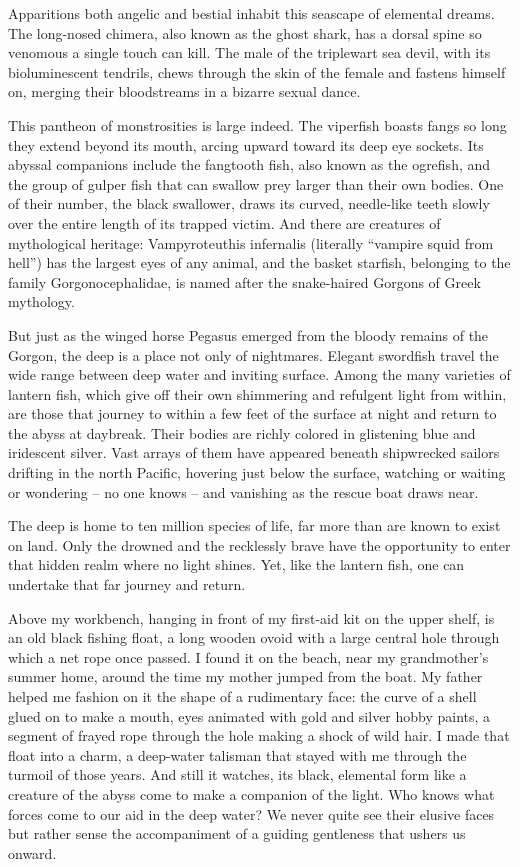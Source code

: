 \documentclass[letterpaper,10pt,headsepline]{scrreprt}
\begin{document}
Apparitions both angelic and bestial inhabit this seascape of elemental dreams. The long-­nosed chimera, also known as the ghost shark, has a dorsal spine so venomous a single touch can kill. The male of the triplewart sea devil, with its bioluminescent tendrils, chews through the skin of the female and fastens himself on, merging their bloodstreams in a bizarre sexual dance.

This pantheon of monstrosities is large indeed. The viperfish boasts fangs so long they extend beyond its mouth, arcing upward toward its deep eye sockets. Its abyssal companions include the fangtooth fish, also known as the ogrefish, and the group of gulper fish that can swallow prey larger than their own bodies. One of their number, the black swallower, draws its curved, needle-­like teeth slowly over the entire length of its trapped victim. And there are creatures of mythological heritage: Vampyroteuthis infernalis (literally “vampire squid from hell”) has the largest eyes of any animal, and the basket starfish, belonging to the family Gorgonocephalidae, is named after the snake-­haired Gorgons of Greek mythology.

But just as the winged horse Pegasus emerged from the bloody remains of the Gorgon, the deep is a place not only of nightmares. Elegant swordfish travel the wide range between deep water and inviting surface. Among the many varieties of lantern fish, which give off their own shimmering and refulgent light from within, are those that journey to within a few feet of the surface at night and return to the abyss at daybreak. Their bodies are richly colored in glistening blue and iridescent silver. Vast arrays of them have appeared beneath shipwrecked sailors drifting in the north Pacific, hovering just below the surface, watching or waiting or wondering – no one knows – and vanishing as the rescue boat draws near.

The deep is home to ten million species of life, far more than are known to exist on land. Only the drowned and the recklessly brave have the opportunity to enter that hidden realm where no light shines. Yet, like the lantern fish, one can undertake that far journey and return.

Above my workbench, hanging in front of my first-­aid kit on the upper shelf, is an old black fishing float, a long wooden ovoid with a large central hole through which a net rope once passed. I found it on the beach, near my grandmother’s summer home, around the time my mother jumped from the boat. My father helped me fashion on it the shape of a rudimentary face: the curve of a shell glued on to make a mouth, eyes animated with gold and silver hobby paints, a segment of frayed rope through the hole making a shock of wild hair. I made that float into a charm, a deep-­water talisman that stayed with me through the turmoil of those years. And still it watches, its black, elemental form like a creature of the abyss come to make a companion of the light. Who knows what forces come to our aid in the deep water? We never quite see their elusive faces but rather sense the accompaniment of a guiding gentleness that ushers us onward.
\end{document}
